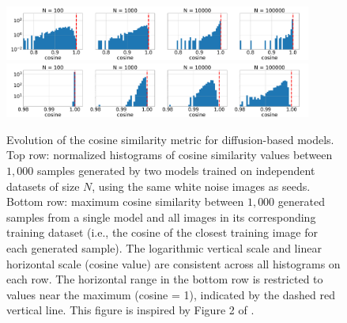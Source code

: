 \documentclass[fleqn,usenatbib]{mnras}
\begin{document}
\begin{figure}
    \centering
        \includegraphics[width=0.9\textwidth]{fig-diffusion-cosine-AB.pdf}\\
    \includegraphics[width=0.9\textwidth]{fig-diffusion-cosine-ATrain.pdf}
    \caption{Evolution of the cosine similarity metric for diffusion-based models. 
    Top row: normalized histograms of cosine similarity values between $1,000$ samples generated by two models trained on independent datasets of size $N$, using the same white noise images as seeds. 
    Bottom row: maximum cosine similarity between $1,000$ generated samples from a single model and all images in its corresponding training dataset (i.e., the cosine of the closest training image for each generated sample). 
    The logarithmic vertical scale and linear horizontal scale (cosine value) are consistent across all histograms on each row. The horizontal range in the bottom row is restricted to values near the maximum (cosine = 1), indicated by the dashed red vertical line. This figure is inspired by Figure 2 of \protect\cite{kadkhodaie2024generalization}.}
    \label{fig-cosine-diffusion}
\end{figure}
\end{document}
